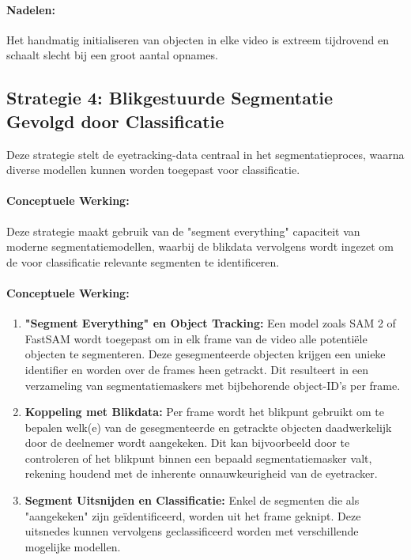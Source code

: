 \paragraph{Nadelen:}
Het handmatig initialiseren van objecten in elke video is extreem tijdrovend en schaalt slecht bij een groot aantal opnames.

\subsection{Strategie 4: Blikgestuurde Segmentatie Gevolgd door Classificatie}

Deze strategie stelt de eyetracking-data centraal in het segmentatieproces, waarna diverse modellen kunnen worden toegepast voor classificatie.

\paragraph{Conceptuele Werking:}

Deze strategie maakt gebruik van de "segment everything" capaciteit van moderne segmentatiemodellen, waarbij de blikdata vervolgens wordt ingezet om de voor classificatie relevante segmenten te identificeren.

\paragraph{Conceptuele Werking:}
\begin{enumerate}
    \item \textbf{"Segment Everything" en Object Tracking:} Een model zoals SAM 2 of FastSAM wordt toegepast om in elk frame van de video alle potentiële objecten te segmenteren. 
    Deze gesegmenteerde objecten krijgen een unieke identifier en worden over de frames heen getrackt. Dit resulteert in een verzameling van segmentatiemaskers met bijbehorende object-ID's per frame.
    \item \textbf{Koppeling met Blikdata:} Per frame wordt het blikpunt gebruikt om te bepalen welk(e) van de gesegmenteerde en getrackte objecten daadwerkelijk door de deelnemer wordt aangekeken. 
    Dit kan bijvoorbeeld door te controleren of het blikpunt binnen een bepaald segmentatiemasker valt, rekening houdend met de inherente onnauwkeurigheid van de eyetracker.
    \item \textbf{Segment Uitsnijden en Classificatie:} Enkel de segmenten die als "aangekeken" zijn geïdentificeerd, worden uit het frame geknipt.
    Deze uitsnedes kunnen vervolgens geclassificeerd worden met verschillende mogelijke modellen.
\end{enumerate}

